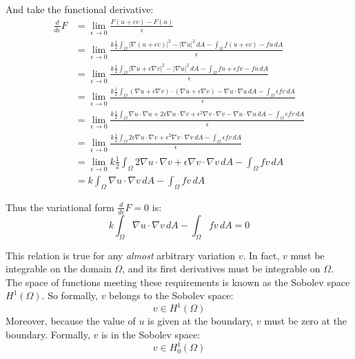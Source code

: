 \documentclass[12pt, a4paper, twoside, openright]{book}
\begin{document}
And take the functional derivative:
\begin{align}
\frac{d}{d\epsilon}F & = \lim_{\epsilon \rightarrow 0}
                         \frac{F(u + \epsilon v) - F(u)}{\epsilon} \\
  & = \lim_{\epsilon \rightarrow 0}
    \frac{k \frac{1}{2} \int_{\Omega} |\nabla (u + \epsilon v)|^2 - |\nabla u|^2 \,dA
        - \int_{\Omega} f (u + \epsilon v) - f u \,dA}
         {\epsilon} \\
  & = \lim_{\epsilon \rightarrow 0}
    \frac{k \frac{1}{2} \int_{\Omega} |\nabla u + \epsilon \nabla v|^2 - |\nabla u|^2 \,dA
        - \int_{\Omega} f u + \epsilon f v - f u \,dA}
         {\epsilon} \\
  & = \lim_{\epsilon \rightarrow 0}
    \frac{k \frac{1}{2} \int_{\Omega} (\nabla u +  \epsilon \nabla v) \cdot 
    (\nabla u +  \epsilon \nabla v) - \nabla u \cdot \nabla u \,dA
        - \int_{\Omega} \epsilon f v \,dA}
         {\epsilon} \\       
  & = \lim_{\epsilon \rightarrow 0}
    \frac{k \frac{1}{2} \int_{\Omega} \nabla u \cdot \nabla u + 2 \epsilon \nabla u \cdot 
    \nabla v + \epsilon^2 \nabla v \cdot \nabla v - \nabla u \cdot \nabla u \,dA
        - \int_{\Omega} \epsilon f v \,dA}
         {\epsilon} \\                    
  & = \lim_{\epsilon \rightarrow 0}
    \frac{k \frac{1}{2} \int_{\Omega} 2 \epsilon \nabla u \cdot \nabla v
     + \epsilon^2 \nabla v \cdot \nabla v \,dA
        - \int_{\Omega} \epsilon f v \,dA}
         {\epsilon} \\
  & = \lim_{\epsilon \rightarrow 0}
    k \frac{1}{2} \int_{\Omega} 2 \nabla u \cdot \nabla v
     + \epsilon \nabla v \cdot \nabla v \,dA
        - \int_{\Omega} f v \,dA\\     
  & =
    k \int_{\Omega} \nabla u \cdot \nabla v \,dA
        - \int_{\Omega} f v \,dA
\end{align}

Thus the variational form $\frac{d}{d\epsilon}F = 0$ is:
\begin{equation}
k \int_{\Omega} \nabla u \cdot \nabla v \,dA
        - \int_{\Omega} f v \,dA = 0
\end{equation}

This relation is true for any \emph{almost} arbitrary variation $v$.  In fact, $v$ must be integrable on the domain $\Omega$, and its first derivatives must be integrable on $\Omega$.
The space of functions meeting these requirements is known as the Sobolev space $H^1(\Omega) $.  So formally, $v$ belongs to the Sobolev space:
\begin{equation}
v \in H^1 (\Omega)
\end{equation}
Moreover, because the value of $u$ is given at the boundary, $v$ must be zero at the boundary.  Formally, $v$ is in the Sobolev space:
\begin{equation}
v \in H_0^1 (\Omega)
\end{equation}
\end{document}
